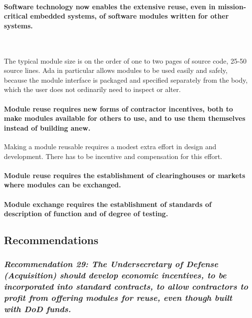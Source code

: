 \documentclass[12pt,final]{article}
\begin{document}
\paragraph{Software technology now enables the extensive reuse, even in mission-critical
embedded systems, of software modules written for other systems.}

\,\par

The typical module size is on the order of one to two pages of source code,
25-50 source lines. Ada in particular allows modules to be used easily and
safely, because the module interface is packaged and specified separately from
the body, which the user does not ordinarily need to inspect or alter.

\paragraph{Module reuse requires new forms of contractor incentives, both to make modules
available for others to use, and to use them themselves instead of building
anew.} Making a module reusable requires a modest extra effort in design and
development. There has to be incentive and compensation for this effort.

\paragraph{Module reuse requires the establishment of clearinghouses or markets where
modules can be exchanged.}

\paragraph{Module exchange requires the establishment of standards of description of
function and of degree of testing.}

\subsection*{Recommendations}

\subsubsection*{\textit{Recommendation 29: The Undersecretary of Defense
(Acquisition) should develop economic incentives, to be incorporated into
standard contracts, to allow contractors to profit from offering modules for
reuse, even though built with DoD funds.}}
\end{document}
